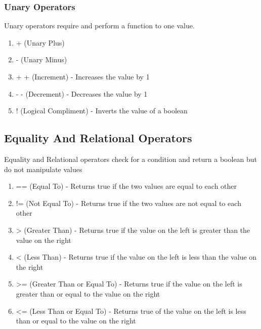 \documentclass[a4paper]{article}
\begin{document}
\subsubsection*{Unary Operators}
Unary operators require and perform a function to one value.

\begin{enumerate}

\item + (Unary Plus)

\item - (Unary Minus)

\item + + (Increment) - Increases the value by 1

\item - - (Decrement) - Decreases the value by 1

\item ! (Logical Compliment) - Inverts the value of a boolean

\end{enumerate}

\subsection*{Equality And Relational Operators}
Equality and Relational operators check for a condition and return a boolean but do not manipulate values
\begin{enumerate}

\item == (Equal To) - Returns true if the two values are equal to each other

\item != (Not Equal To) - Returns true if the two values are not equal to each other

\item > (Greater Than) - Returns true if the value on the left is greater than the value on the right

\item < (Less Than) - Returns true if the value on the left is less than the value on the right

\item >= (Greater Than or Equal To) - Returns true if the value on the left is greater than or equal to the value on the right

\item <= (Less Than or Equal To) - Returns true of the value on the left is less than or equal to the value on the right

\end{enumerate}
\end{document}
